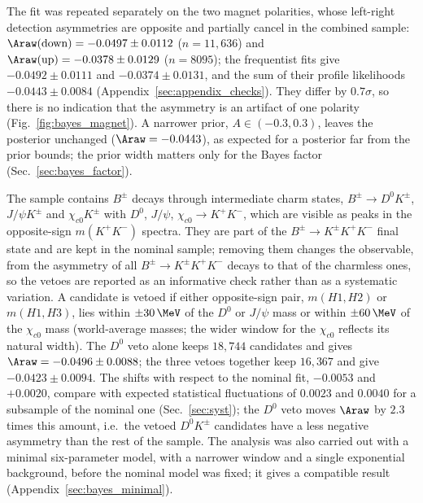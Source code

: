The fit was repeated separately on the two magnet polarities, whose left-right detection asymmetries are opposite and partially cancel in the combined sample: $\Araw(\text{down})=-0.0497\pm0.0112$ ($n=11{,}636$) and $\Araw(\text{up})=-0.0378\pm0.0129$ ($n=8095$); the frequentist fits give $-0.0492\pm0.0111$ and $-0.0374\pm0.0131$, and the sum of their profile likelihoods $-0.0443\pm0.0084$ (Appendix~\ref{sec:appendix_checks}). They differ by $0.7\sigma$, so there is no indication that the asymmetry is an artifact of one polarity (Fig.~\ref{fig:bayes_magnet}). A narrower prior, $A\in(-0.3,0.3)$, leaves the posterior unchanged ($\Araw=-0.0443$), as expected for a posterior far from the prior bounds; the prior width matters only for the Bayes factor (Sec.~\ref{sec:bayes_factor}).



The sample contains $B^\pm$ decays through intermediate charm states, $B^\pm\to D^0K^\pm$, $J/\psi K^\pm$ and $\chi_{c0}K^\pm$ with $D^0$, $J/\psi$, $\chi_{c0}\to K^+K^-$, which are visible as peaks in the opposite-sign $m(K^+K^-)$ spectra. They are part of the $B^\pm\to K^\pm K^+K^-$ final state and are kept in the nominal sample; removing them changes the observable, from the asymmetry of all $B^\pm\to K^\pm K^+K^-$ decays to that of the charmless ones, so the vetoes are reported as an informative check rather than as a systematic variation. A candidate is vetoed if either opposite-sign pair, $m(H1,H2)$ or $m(H1,H3)$, lies within $\pm30\,\MeV$ of the $D^0$ or $J/\psi$ mass or within $\pm60\,\MeV$ of the $\chi_{c0}$ mass (world-average masses; the wider window for the $\chi_{c0}$ reflects its natural width). The $D^0$ veto alone keeps $18{,}744$ candidates and gives $\Araw=-0.0496\pm0.0088$; the three vetoes together keep $16{,}367$ and give $-0.0423\pm0.0094$. The shifts with respect to the nominal fit, $-0.0053$ and $+0.0020$, compare with expected statistical fluctuations of $0.0023$ and $0.0040$ for a subsample of the nominal one (Sec.~\ref{sec:syst}); the $D^0$ veto moves $\Araw$ by $2.3$ times this amount, i.e.\ the vetoed $D^0K^\pm$ candidates have a less negative asymmetry than the rest of the sample. The analysis was also carried out with a minimal six-parameter model, with a narrower window and a single exponential background, before the nominal model was fixed; it gives a compatible result (Appendix~\ref{sec:bayes_minimal}).

